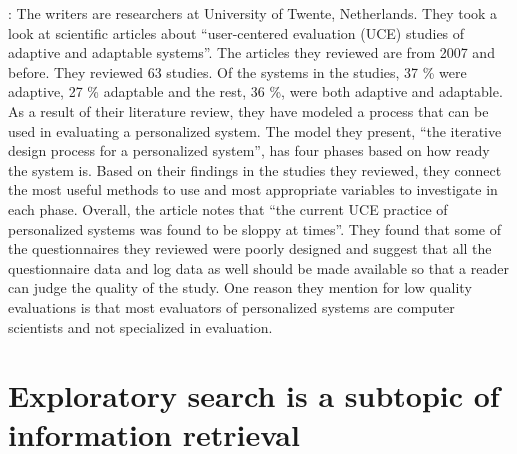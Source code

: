 \documentclass{sigchi}
\begin{document}
\cite{van08}: The writers are researchers at University of Twente, Netherlands. They took a look at scientific articles about “user-centered evaluation (UCE) studies of adaptive and adaptable systems”. The articles they reviewed are from 2007 and before. They reviewed 63 studies. Of the systems in the studies, 37 \% were adaptive, 27 \% adaptable and the rest, 36 \%, were both adaptive and adaptable. As a result of their literature review, they have modeled a process that can be used in evaluating a personalized system.
The model they present, “the iterative design process for a personalized system”, has four phases based on how ready the system is. Based on their findings in the studies they reviewed, they connect the most useful methods to use and most appropriate variables to investigate in each phase.
Overall, the article notes that “the current UCE practice of personalized systems was found to be sloppy at times”. They found that some of the questionnaires they reviewed were poorly designed and suggest that all the questionnaire data and log data as well should be made available so that a reader can judge the quality of the study. One reason they mention for low quality evaluations is that most evaluators of personalized systems are computer scientists and not specialized in evaluation.

\section {Exploratory search is a subtopic of information retrieval}
\end{document}

